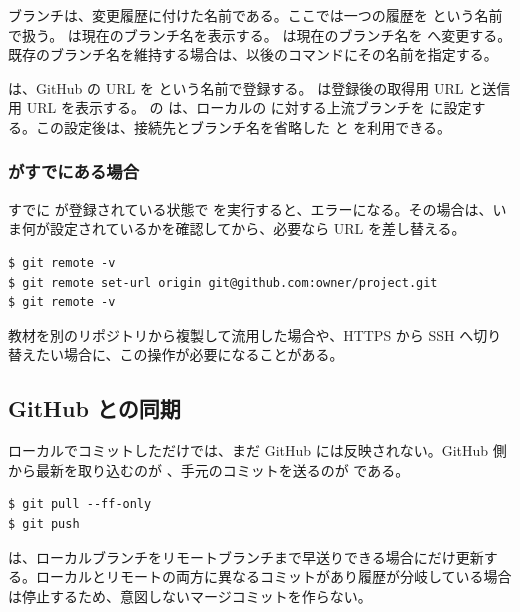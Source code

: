 ブランチは、変更履歴に付けた名前である。ここでは一つの履歴を  という名前で扱う。 は現在のブランチ名を表示する。 は現在のブランチ名を  へ変更する。既存のブランチ名を維持する場合は、以後のコマンドにその名前を指定する。

 は、GitHub の URL を  という名前で登録する。 は登録後の取得用 URL と送信用 URL を表示する。 の  は、ローカルの  に対する上流ブランチを  に設定する。この設定後は、接続先とブランチ名を省略した  と  を利用できる。

\subsubsection{ がすでにある場合}

すでに  が登録されている状態で  を実行すると、エラーになる。その場合は、いま何が設定されているかを確認してから、必要なら URL を差し替える。

\begin{lstlisting}[numbers=none, xleftmargin=2\zw]
$ git remote -v
$ git remote set-url origin git@github.com:owner/project.git
$ git remote -v
\end{lstlisting}

教材を別のリポジトリから複製して流用した場合や、HTTPS から SSH へ切り替えたい場合に、この操作が必要になることがある。

\subsection{GitHub との同期}

ローカルでコミットしただけでは、まだ GitHub には反映されない。GitHub 側から最新を取り込むのが 、手元のコミットを送るのが  である。

\begin{lstlisting}[numbers=none, xleftmargin=2\zw]
$ git pull --ff-only
$ git push
\end{lstlisting}

 は、ローカルブランチをリモートブランチまで早送りできる場合にだけ更新する。ローカルとリモートの両方に異なるコミットがあり履歴が分岐している場合は停止するため、意図しないマージコミットを作らない。

